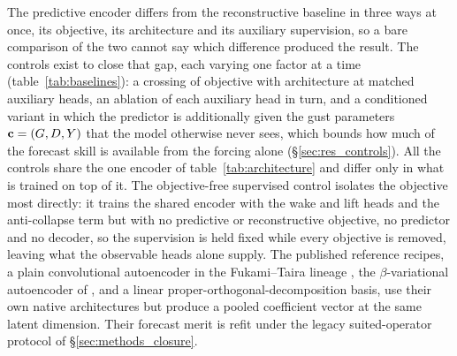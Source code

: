 The predictive encoder differs from the reconstructive baseline in three ways at once, its objective, its architecture and its auxiliary supervision, so a bare comparison of the two cannot say which difference produced the result. The controls exist to close that gap, each varying one factor at a time (table~\ref{tab:baselines}): a crossing of objective with architecture at matched auxiliary heads, an ablation of each auxiliary head in turn, and a conditioned variant in which the predictor is additionally given the gust parameters $\mathbf{c} = (G, D, Y)$ that the model otherwise never sees, which bounds how much of the forecast skill is available from the forcing alone (\S\ref{sec:res_controls}). All the controls share the one encoder of table~\ref{tab:architecture} and differ only in what is trained on top of it. The objective-free supervised control isolates the objective most directly: it trains the shared encoder with the wake and lift heads and the anti-collapse term but with no predictive or reconstructive objective, no predictor and no decoder, so the supervision is held fixed while every objective is removed, leaving what the observable heads alone supply. The published reference recipes, a plain convolutional autoencoder in the Fukami--Taira lineage \citep{fukami2023,fukami2025}, the $\beta$-variational autoencoder of \citet{solera2024}, and a linear proper-orthogonal-decomposition basis, use their own native architectures but produce a pooled coefficient vector at the same latent dimension. Their forecast merit is refit under the legacy suited-operator protocol of \S\ref{sec:methods_closure}.\re



